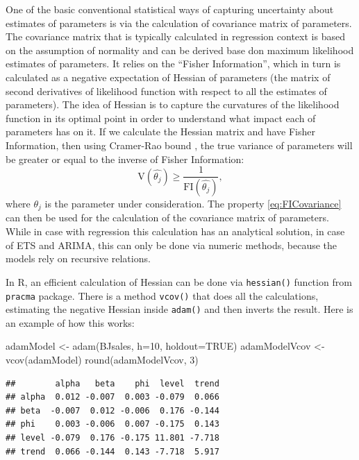 \documentclass[
]{book}
\newenvironment{Shaded}{\begin{snugshade}}{\end{snugshade}}
\newcommand{\AttributeTok}[1]{\textcolor[rgb]{0.77,0.63,0.00}{#1}}
\newcommand{\ConstantTok}[1]{\textcolor[rgb]{0.00,0.00,0.00}{#1}}
\newcommand{\DecValTok}[1]{\textcolor[rgb]{0.00,0.00,0.81}{#1}}
\newcommand{\FunctionTok}[1]{\textcolor[rgb]{0.00,0.00,0.00}{#1}}
\newcommand{\NormalTok}[1]{#1}
\newcommand{\OtherTok}[1]{\textcolor[rgb]{0.56,0.35,0.01}{#1}}
\theoremstyle{definition}
\theoremstyle{definition}
\theoremstyle{definition}
\theoremstyle{definition}
\theoremstyle{remark}
\begin{document}
One of the basic conventional statistical ways of capturing uncertainty about estimates of parameters is via the calculation of covariance matrix of parameters. The covariance matrix that is typically calculated in regression context is based on the assumption of normality and can be derived base don maximum likelihood estimates of parameters. It relies on the ``Fisher Information'', which in turn is calculated as a negative expectation of Hessian of parameters (the matrix of second derivatives of likelihood function with respect to all the estimates of parameters). The idea of Hessian is to capture the curvatures of the likelihood function in its optimal point in order to understand what impact each of parameters has on it. If we calculate the Hessian matrix and have Fisher Information, then using Cramer-Rao bound \citep{WikipediaCramerRaoBound}, the true variance of parameters will be greater or equal to the inverse of Fisher Information:
\begin{equation}
    \mathrm{V}(\hat{\theta_j}) \geq \frac{1}{\mathrm{FI}(\hat{\theta_j})} ,
    \label{eq:FICovariance}
\end{equation}
where \(\theta_j\) is the parameter under consideration. The property \eqref{eq:FICovariance} can then be used for the calculation of the covariance matrix of parameters. While in case with regression this calculation has an analytical solution, in case of ETS and ARIMA, this can only be done via numeric methods, because the models rely on recursive relations.

In R, an efficient calculation of Hessian can be done via \texttt{hessian()} function from \texttt{pracma} package. There is a method \texttt{vcov()} that does all the calculations, estimating the negative Hessian inside \texttt{adam()} and then inverts the result. Here is an example of how this works:

\begin{Shaded}
\begin{Highlighting}[]
\NormalTok{adamModel }\OtherTok{\textless{}{-}} \FunctionTok{adam}\NormalTok{(BJsales, }\AttributeTok{h=}\DecValTok{10}\NormalTok{, }\AttributeTok{holdout=}\ConstantTok{TRUE}\NormalTok{)}
\NormalTok{adamModelVcov }\OtherTok{\textless{}{-}} \FunctionTok{vcov}\NormalTok{(adamModel)}
\FunctionTok{round}\NormalTok{(adamModelVcov, }\DecValTok{3}\NormalTok{)}
\end{Highlighting}
\end{Shaded}

\begin{verbatim}
##        alpha   beta    phi  level  trend
## alpha  0.012 -0.007  0.003 -0.079  0.066
## beta  -0.007  0.012 -0.006  0.176 -0.144
## phi    0.003 -0.006  0.007 -0.175  0.143
## level -0.079  0.176 -0.175 11.801 -7.718
## trend  0.066 -0.144  0.143 -7.718  5.917
\end{verbatim}
\end{document}

